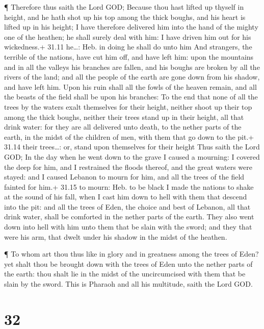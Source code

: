  ¶ Therefore thus saith the Lord GOD; Because thou hast
lifted up thyself in height, and he hath shot up his top among the thick
boughs, and his heart is lifted up in his height;  I have
therefore delivered him into the hand of the mighty one of the heathen;
he shall surely deal with him: I have driven him out for his
wickedness.+ 31.11 he\ldots: Heb. in doing he shall do unto him
 And strangers, the terrible of the nations, have cut him
off, and have left him: upon the mountains and in all the valleys his
branches are fallen, and his boughs are broken by all the rivers of the
land; and all the people of the earth are gone down from his shadow, and
have left him.  Upon his ruin shall all the fowls of the
heaven remain, and all the beasts of the field shall be upon his
branches:  To the end that none of all the trees by the
waters exalt themselves for their height, neither shoot up their top
among the thick boughs, neither their trees stand up in their height,
all that drink water: for they are all delivered unto death, to the
nether parts of the earth, in the midst of the children of men, with
them that go down to the pit.+ 31.14 their trees\ldots: or, stand upon
themselves for their height  Thus saith the Lord GOD; In
the day when he went down to the grave I caused a mourning: I covered
the deep for him, and I restrained the floods thereof, and the great
waters were stayed: and I caused Lebanon to mourn for him, and all the
trees of the field fainted for him.+ 31.15 to mourn: Heb. to be black
 I made the nations to shake at the sound of his fall, when
I cast him down to hell with them that descend into the pit: and all the
trees of Eden, the choice and best of Lebanon, all that drink water,
shall be comforted in the nether parts of the earth.  They
also went down into hell with him unto them that be slain with the
sword; and they that were his arm, that dwelt under his shadow in the
midst of the heathen.

 ¶ To whom art thou thus like in glory and in greatness
among the trees of Eden? yet shalt thou be brought down with the trees
of Eden unto the nether parts of the earth: thou shalt lie in the midst
of the uncircumcised with them that be slain by the sword. This is
Pharaoh and all his multitude, saith the Lord GOD.

\hypertarget{section-31}{%
\section{32}\label{section-31}}

